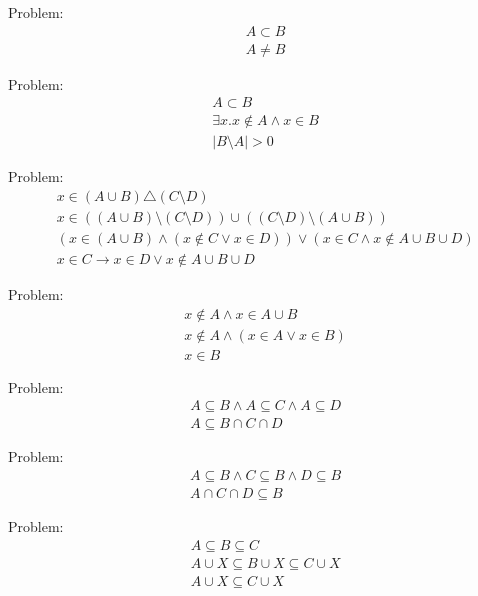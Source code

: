 \documentclass[12pt,letterpaper]{article}
\begin{document}
Problem:
\begin{align}
& A \subset B
\\
& A \neq B
\end{align}

Problem:
\begin{align}
& A \subset B
\\
& \exists x. x \notin A \wedge x \in B
\\
& | B \setminus A | > 0
\end{align}

Problem:
\begin{align}
& x \in ( A \cup B ) \triangle ( C \setminus D )
\\
& x \in (( A \cup B ) \setminus ( C \setminus D )) \cup (( C \setminus D ) \setminus ( A \cup B ))
\\
& (x \in ( A \cup B ) \wedge (x \notin C \vee x \in D )) \vee (x \in C \wedge x \notin A \cup B \cup D )
\\
& x \in C \rightarrow x \in D \vee x \notin A \cup B \cup D
\end{align}

Problem:
\begin{align}
& x \notin A \wedge x \in A \cup B
\\
& x \notin A \wedge (x \in A \vee x \in B )
\\
& x \in B
\end{align}

Problem:
\begin{align}
& A \subseteq B \wedge A \subseteq C \wedge A \subseteq D
\\
& A \subseteq B \cap C \cap D
\end{align}

Problem:
\begin{align}
& A \subseteq B \wedge C \subseteq B \wedge D \subseteq B
\\
& A \cap C \cap D \subseteq B
\end{align}

Problem:
\begin{align}
& A \subseteq B \subseteq C
\\
& A \cup X \subseteq B \cup X \subseteq C \cup X
\\
& A \cup X \subseteq C \cup X
\end{align}
\end{document}
